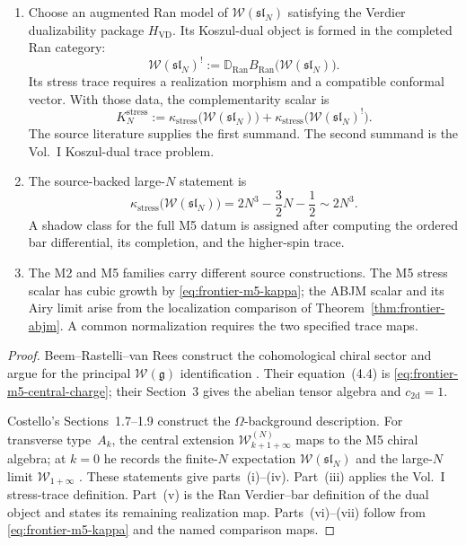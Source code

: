 \begin{theorem}
\begin{enumerate}[label=\textup{(\roman*)}]
\item Choose an augmented Ran model of
$\mathcal W(\mathfrak{sl}_N)$ satisfying the Verdier dualizability
package $H_{\mathrm{VD}}$.  Its Koszul-dual object is formed in the
completed Ran category:
\begin{equation}\label{eq:frontier-m5-kappa-dual}
 \mathcal W(\mathfrak{sl}_N)^!
 :=\mathbb D_{\operatorname{Ran}}
       B_{\operatorname{Ran}}\bigl(\mathcal W(\mathfrak{sl}_N)\bigr).
\end{equation}
Its stress trace requires a realization morphism and a compatible
conformal vector.  With those data, the complementarity scalar is
\begin{equation}\label{eq:frontier-m5-complementarity}
 K_N^{\mathrm{stress}}
 :=\kappa_{\mathrm{stress}}\bigl(\mathcal W(\mathfrak{sl}_N)\bigr)
  +\kappa_{\mathrm{stress}}
       \bigl(\mathcal W(\mathfrak{sl}_N)^!\bigr).
\end{equation}
The source literature supplies the first summand.  The second summand
is the Vol.~I Koszul-dual trace problem.

\item The source-backed large-$N$ statement is
\begin{equation}\label{eq:frontier-m5-complementarity-leading}
 \kappa_{\mathrm{stress}}\bigl(\mathcal W(\mathfrak{sl}_N)\bigr)
 =2N^3-\frac32N-\frac12
 \sim2N^3.
\end{equation}
A shadow class for the full M5 datum is assigned after computing the
ordered bar differential, its completion, and the higher-spin trace.

\item The M2 and M5 families carry different source constructions.
The M5 stress scalar has cubic growth by
\eqref{eq:frontier-m5-kappa}; the ABJM scalar and its Airy limit arise
from the localization comparison of
Theorem~\ref{thm:frontier-abjm}.  A common normalization requires the
two specified trace maps.
\end{enumerate}
\end{theorem}

\begin{proof}
Beem--Rastelli--van Rees construct the cohomological chiral sector and
argue for the principal $\mathcal W(\mathfrak g)$ identification
\cite[\S\S2--4]{BRvR14-6d}.  Their equation~(4.4) is
\eqref{eq:frontier-m5-central-charge}; their Section~3 gives the
abelian tensor algebra and $c_{2\mathrm d}=1$.

Costello's Sections~1.7--1.9 construct the $\Omega$-background
description.  For transverse type~$A_k$, the central extension
$\mathcal W_{k+1+\infty}^{(N)}$ maps to the M5 chiral algebra; at
$k=0$ he records the finite-$N$ expectation
$\mathcal W(\mathfrak{sl}_N)$ and the large-$N$ limit
$\mathcal W_{1+\infty}$ \cite{Costello2111}.  These statements give
parts~(i)--(iv).  Part~(iii) applies the Vol.~I stress-trace definition.
Part~(v) is the Ran Verdier--bar definition of the dual object and
states its remaining realization map.  Parts~(vi)--(vii) follow from
\eqref{eq:frontier-m5-kappa} and the named comparison maps.
\end{proof}

